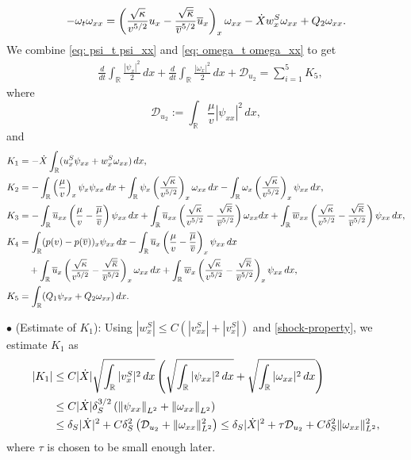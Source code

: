 \documentclass[11pt,reqno]{amsart}
\begin{document}
\begin{appendix}
\begin{equation}\label{eq: omega_t omega_xx}
-\omega _t \omega_{xx}= \left( \frac{\sqrt{\kappa}}{v^{5/2}} u_x - \frac{\sqrt{\overline{\kappa}}}{\overline{v}^{5/2}} \overline{u}_x \right)_x \omega_{xx} - \dot{X} w^S_x \omega_{xx} +Q_2 \omega_{xx}.
\end{equation}
We combine \eqref{eq: psi_t psi_xx} and \eqref{eq: omega_t omega_xx} to get
\begin{align*}
&\frac{d}{dt}\int_{\mathbb{R}} \frac{|\psi_x|^2}{2} \,dx+\frac{d}{dt}\int_{\mathbb{R}} \frac{|\omega_x|^2}{2} \,dx + \mathcal{D}_{u_2} = \sum_{i=1}^5 K_5,
\end{align*}
where
\[\mathcal{D}_{u_2}:=\int_{\mathbb{R}}\frac{\mu}{v} |\psi_{xx}|^2\,dx,\]
and
\begin{align*}
K_1&=-\dot{X}\int_{\mathbb{R}} (u^S_x\psi_{xx}+w^S_x \omega_{xx})\,dx,\\ 
K_2&=-\int_{\mathbb{R}} \left(\frac{\mu}{v}\right)_x\psi_x\psi_{xx} \, dx + \int_{\mathbb{R}}\psi_x \left( \frac{\sqrt{\kappa}}{v^{5/2}}\right)_x \omega_{xx} \, dx -\int_{\mathbb{R}}\omega_x \left( \frac{\sqrt{\kappa}}{v^{5/2}}\right)_x \psi_{xx} \, dx,\\     
K_3&=-\int_{\mathbb{R}} \overline{u}_{xx}\left(\frac{\mu}{v}-\frac{\overline{\mu}}{\overline{v}}\right)\psi_{xx} \, dx + \int_{\mathbb{R}}\overline{u}_{xx} \left( \frac{\sqrt{\kappa}}{v^{5/2}}-\frac{\sqrt{\overline{\kappa}}}{\overline{v}^{5/2}} \right) \omega_{xx}dx + \int_{\mathbb{R}}\overline{w}_{xx} \left( \frac{\sqrt{\kappa}}{v^{5/2}}-\frac{\sqrt{\overline{\kappa}}}{\overline{v}^{5/2}} \right) \psi_{xx} \, dx, \\
K_4&=\int_{\mathbb{R}} (p(v)-p(\overline{v}))_x \psi_{xx}\,dx-\int_{\mathbb{R}} \overline{u}_x\left(\frac{\mu}{v}-\frac{\overline{\mu}}{\overline{v}}\right)_x\psi_{xx} \, dx \\ 
&\quad +\int_{\mathbb{R}} \overline{u}_x \left( \frac{\sqrt{\kappa}}{v^{5/2}}-\frac{\sqrt{\overline{\kappa}}}{\overline{v}^{5/2}} \right)_x \omega_{xx} \, dx+\int_{\mathbb{R}}\overline{w}_x \left( \frac{\sqrt{\kappa}}{v^{5/2}}-\frac{\sqrt{\overline{\kappa}}}{\overline{v}^{5/2}} \right)_x \psi_{xx} \, dx,\\
K_5&=\int_\mathbb{R} (Q_1 \psi_{xx} + Q_2 \omega_{xx}) \, dx.
\end{align*}

\noindent $\bullet$ (Estimate of $K_1$):  Using $|w^S_x|\le C(|v^S_{xx}|+|v^S_x|)$ and \eqref{shock-property}, we estimate $K_1$ as
\begin{align*}
|K_1|
&\le C |\dot{X}|\sqrt{\int_\mathbb{R} |v^S_x|^2 \, dx } \left( \sqrt{\int_{\mathbb{R}} |\psi_{xx}|^2 \,dx} + \sqrt{\int_\mathbb{R} |\omega_{xx}|^2 \, dx}\right) \\
&\le C |\dot{X}| \delta_S^{3/2} \left( \left\lVert\psi_{xx}\right\rVert_{L^2} + \left\lVert\omega_{xx}\right\rVert_{L^2} \right) \\ 
&\le \delta_S|\dot{X}|^2+C\delta_S^2 \left( \mathcal{D}_{u_2} + \lVert \omega_{xx} \rVert^2_{L^2} \right) \le  \delta_S|\dot{X}|^2+ \tau \mathcal{D}_{u_2} + C \delta_S^2 \| \omega_{xx} \|_{L^2}^2,
\end{align*}
where $\tau$ is chosen to be small enough later.\\


\end{appendix}
\end{document}
